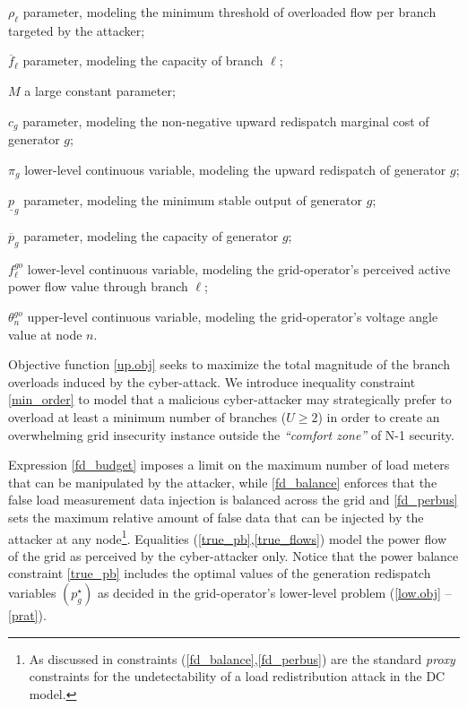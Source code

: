 \documentclass{IEEEtran4PSCC}
\newenvironment{mydescription}[1]
  {\begin{list}{}%
   {\renewcommand\makelabel[1]{##1 \hfill}%
   \settowidth\labelwidth{\makelabel{#1}}%
   \setlength\leftmargin{\labelwidth}
   \addtolength\leftmargin{\labelsep}}}
  {\end{list}}
\begin{document}
\begin{mydescription}{$sev$}
	\item[$\rho_{\ell}$]{parameter, modeling the minimum threshold of overloaded flow per branch targeted by the attacker;}
	\item[$\overline{f}_{\ell}$]{parameter, modeling the capacity of branch $\ell$;}
	\item[$M$]{a large constant parameter;}
	\item[${c}_g$]{parameter, modeling the non-negative upward redispatch marginal cost of generator $g$;}
	\item[$\pi_g$]{lower-level continuous variable, modeling the upward redispatch of generator $g$;} 
	\item[$\underline{p}_g$]{parameter, modeling the minimum stable output of generator $g$;}
	\item[$\overline{p}_g$]{parameter, modeling the capacity of generator $g$;}
	\item[$f_{\ell}^{go}$]{lower-level continuous variable, modeling the grid-operator's perceived active power flow value through branch $\ell$;}
	\item[$\theta_n^{go}$]{upper-level continuous variable, modeling the grid-operator's voltage angle value at node $n$.}
\end{mydescription}

Objective function \eqref{up.obj} seeks to maximize the total magnitude of the branch overloads induced by the cyber-attack. We introduce inequality constraint \eqref{min_order} to model that a malicious cyber-attacker may strategically prefer to overload at least a minimum number of branches ($U\ge 2$) in order to create an overwhelming grid insecurity instance outside the \emph{``comfort zone''} of N-1 security.

Expression \eqref{fd_budget} imposes a limit on the maximum number of load meters that can be manipulated by the attacker, while \eqref{fd_balance} enforces that the false load measurement data injection is balanced across the grid and \eqref{fd_perbus} sets the maximum relative amount of false data that can be injected by the attacker at any node\footnote{As discussed in \cite{che2018false} constraints (\ref{fd_balance},\ref{fd_perbus}) are the standard \emph{proxy} constraints for the undetectability of a load redistribution attack in the DC model.}. Equalities (\ref{true_pb},\ref{true_flows}) model the power flow of the grid as perceived by the cyber-attacker only. Notice that the power balance constraint \eqref{true_pb} includes the optimal values of the generation redispatch variables $(p_{g}^{\star})$ as decided in the grid-operator's lower-level problem (\ref{low.obj} -- \ref{prat}). 
\end{document}
